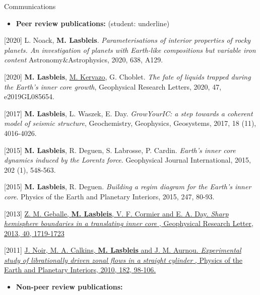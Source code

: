\documentclass{cv}
\newcommand{\compresslist}{
	\setlength{\itemsep}{1pt}
	\setlength{\parskip}{0pt}
	\setlength{\parsep}{0pt}
}
\begin{document}
\begin{rubrique}{Communications}%

	\vspace{-0.3cm}
	\begin{itemize}\compresslist
		\item \textbf{Peer review publications:} (student: underline)
	 \end{itemize}
	 \vspace{-0.3cm}


	 [2020] L. Noack, \textbf{M. Lasbleis}. \textit{Parameterisations of interior properties of rocky planets. 
	 An investigation of planets with Earth-like compositions but variable iron content} Astronomy\&Astrophysics, 2020, 638, A129.


	 [2020] \textbf{M. Lasbleis}, \underline{M. Kervazo}, G. Choblet. \textit{The fate of liquids trapped during the Earth's inner core growth}, Geophysical Research Letters, 2020, 47, e2019GL085654.



[2017]	 \textbf{M. Lasbleis}, L. Waszek, E. Day. \textit{GrowYourIC: a step towards a coherent model of seismic
	structure}, Geochemistry, Geophysics, Geosystems, 2017, 18 (11), 4016-4026.


[2015] \textbf{M. Lasbleis}, R. Deguen, S. Labrosse, P. Cardin. \textit{Earth's inner core dynamics
	induced by the Lorentz force}. Geophysical Journal International, 2015, 202 (1), 548-563. 

[2015] \textbf{M. Lasbleis}, R. Deguen. \textit{Building a regim diagram for the Earth's inner
  core}. Physics of the Earth and Planetary Interiors, 2015, 247, 80-93.  

[2013] \href{http://onlinelibrary.wiley.com/doi/10.1002/grl.50372/abstract}{Z. M. Geballe,
  \textbf{M. Lasbleis}, V. F. Cormier and E. A. Day.  \textit{Sharp hemisphere
    boundaries in a translating inner core} , Geophysical Research Letter, 2013,  40, 1719-1723}

[2011] \href{http://www.sciencedirect.com/science/article/pii/S0031920110001329}{J. Noir,
  M. A. Calkins,  \textbf{M. Lasbleis} and J. M. Aurnou.  \textit{Experimental study
    of librationally driven zonal flows in a straight cylinder} ,
  Physics of the  Earth and Planetary Interiors, 2010,  182, 98-106.}

\begin{itemize}\compresslist
	\item \textbf{Non-peer review publications:}
\end{itemize}
\vspace{-0.3cm}


\end{rubrique}
\end{document}
